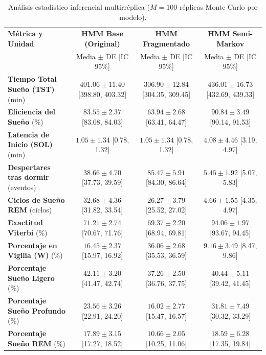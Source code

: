 \documentclass[11pt,a4paper]{article}
\begin{document}
\begin{table}[htbp]
\centering
\small
\caption{Análisis estadístico inferencial multirréplica ($M = 100$ réplicas Monte Carlo por modelo).}
\label{tab:montecarlo}
\renewcommand{\arraystretch}{0.90}
\setlength{\tabcolsep}{3pt}
\begin{tabularx}{\textwidth}{>{\raggedright\arraybackslash}X c c c}
\toprule
\textbf{Métrica y Unidad} & \textbf{HMM Base (Original)} & \textbf{HMM Fragmentado} & \textbf{HMM Semi-Markov} \\
& Media $\pm$ DE [IC 95\%] & Media $\pm$ DE [IC 95\%] & Media $\pm$ DE [IC 95\%] \\
\midrule
\textbf{Tiempo Total Sueño (TST)} (min) & $401.06 \pm 11.40$ [398.80, 403.32] & $306.90 \pm 12.84$ [304.35, 309.45] & $436.01 \pm 16.73$ [432.69, 439.33] \\
\addlinespace
\textbf{Eficiencia del Sueño} (\%) & $83.55 \pm 2.37$ [83.08, 84.03] & $63.94 \pm 2.68$ [63.41, 64.47] & $90.84 \pm 3.49$ [90.14, 91.53] \\
\addlinespace
\textbf{Latencia de Inicio (SOL)} (min) & $1.05 \pm 1.34$ [0.78, 1.32] & $1.05 \pm 1.34$ [0.78, 1.32] & $4.08 \pm 4.46$ [3.19, 4.97] \\
\addlinespace
\textbf{Despertares tras dormir} (eventos) & $38.66 \pm 4.70$ [37.73, 39.59] & $85.47 \pm 5.91$ [84.30, 86.64] & $5.45 \pm 1.92$ [5.07, 5.83] \\
\addlinespace
\textbf{Ciclos de Sueño REM} (ciclos) & $32.68 \pm 4.36$ [31.82, 33.54] & $26.27 \pm 3.79$ [25.52, 27.02] & $4.66 \pm 1.55$ [4.35, 4.97] \\
\addlinespace
\textbf{Exactitud Viterbi} (\%) & $71.21 \pm 2.74$ [70.67, 71.76] & $69.37 \pm 2.20$ [68.94, 69.81] & $94.06 \pm 1.97$ [93.67, 94.45] \\
\addlinespace
\textbf{Porcentaje en Vigilia (W)} (\%) & $16.45 \pm 2.37$ [15.97, 16.92] & $36.06 \pm 2.68$ [35.53, 36.59] & $9.16 \pm 3.49$ [8.47, 9.86] \\
\addlinespace
\textbf{Porcentaje Sueño Ligero} (\%) & $42.11 \pm 3.20$ [41.47, 42.74] & $37.26 \pm 2.50$ [36.76, 37.75] & $40.44 \pm 5.11$ [39.42, 41.45] \\
\addlinespace
\textbf{Porcentaje Sueño Profundo} (\%) & $23.56 \pm 3.26$ [22.91, 24.20] & $16.02 \pm 2.77$ [15.47, 16.57] & $31.81 \pm 7.49$ [30.32, 33.29] \\
\addlinespace
\textbf{Porcentaje Sueño REM} (\%) & $17.89 \pm 3.15$ [17.27, 18.52] & $10.66 \pm 2.05$ [10.25, 11.06] & $18.59 \pm 6.28$ [17.35, 19.84] \\
\bottomrule
\end{tabularx}
\end{table}
\end{document}

